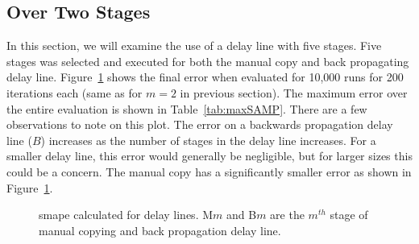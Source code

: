 \subsection{Over Two Stages}
\label{sec:dl_paper_over_two_stages}
In this section, we will examine the use of a delay line with five stages. Five stages was selected and executed for both the manual copy and back propagating delay line. Figure~\ref{fig:fiveStageAbsDiff} shows the final error when evaluated for 10,000 runs for 200 iterations each (same as for $m=2$ in previous section). The maximum error over the entire evaluation is shown in Table~\ref{tab:maxSAMP}. There are a few observations to note on this plot. The error on a backwards propagation delay line ($B$) increases as the number of stages in the delay line increases. For a smaller delay line, this error would generally be negligible, but for larger sizes this could be a concern. The manual copy has a significantly smaller error as shown in Figure~\ref{fig:fiveStageAbsDiff}.

\begin{figure}[ht]
	\centering
	\caption[Error for Both Delay Lines]{\Gls{smape} calculated for delay lines. M$m$ and B$m$ are the $m^{th}$ stage of manual copying and back propagation delay line.}
	\label{fig:fiveStageAbsDiff}
\end{figure}

